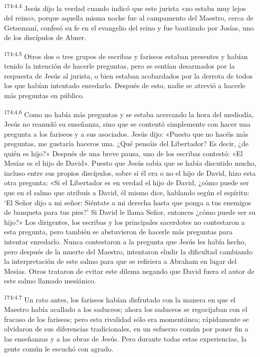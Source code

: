 \par 
\textsuperscript{174:4.4} Jesús dijo la verdad cuando indicó que este jurista «no estaba muy lejos del reino», porque aquella misma noche fue al campamento del Maestro, cerca de Getsemaní, confesó su fe en el evangelio del reino y fue bautizado por Josías, uno de los discípulos de Abner.

\par 
\textsuperscript{174:4.5} Otros dos o tres grupos de escribas y fariseos estaban presentes y habían tenido la intención de hacerle preguntas, pero se sentían desarmados por la respuesta de Jesús al jurista, o bien estaban acobardados por la derrota de todos los que habían intentado enredarlo. Después de esto, nadie se atrevió a hacerle más preguntas en público.

\par 
\textsuperscript{174:4.6} Como no había más preguntas y se estaba acercando la hora del mediodía, Jesús no reanudó su enseñanza, sino que se contentó simplemente con hacer una pregunta a los fariseos y a sus asociados. Jesús dijo: «Puesto que no hacéis más preguntas, me gustaría haceros una. ¿Qué pensáis del Libertador? Es decir, ¿de quién es hijo?» Después de una breve pausa, uno de los escribas contestó: «El Mesías es el hijo de David». Puesto que Jesús sabía que se había discutido mucho, incluso entre sus propios discípulos, sobre si él era o no el hijo de David, hizo esta otra pregunta: «Si el Libertador es en verdad el hijo de David, ¿cómo puede ser que en el salmo que atribuís a David, él mismo dice, hablando según el espíritu: `El Señor dijo a mi señor: Siéntate a mi derecha hasta que ponga a tus enemigos de banqueta para tus pies?' Si David le llama Señor, entonces ¿cómo puede ser su hijo?» Los dirigentes, los escribas y los principales sacerdotes no contestaron a esta pregunta, pero también se abstuvieron de hacerle más preguntas para intentar enredarlo. Nunca contestaron a la pregunta que Jesús les había hecho, pero después de la muerte del Maestro, intentaron eludir la dificultad cambiando la interpretación de este salmo para que se refiriera a Abraham en lugar del Mesías. Otros trataron de evitar este dilema negando que David fuera el autor de este salmo llamado mesiánico.

\par 
\textsuperscript{174:4.7} Un rato antes, los fariseos habían disfrutado con la manera en que el Maestro había acallado a los saduceos; ahora los saduceos se regocijaban con el fracaso de los fariseos; pero esta rivalidad sólo era momentánea; rápidamente se olvidaron de sus diferencias tradicionales, en un esfuerzo común por poner fin a las enseñanzas y a las obras de Jesús. Pero durante todas estas experiencias, la gente común le escuchó con agrado.


